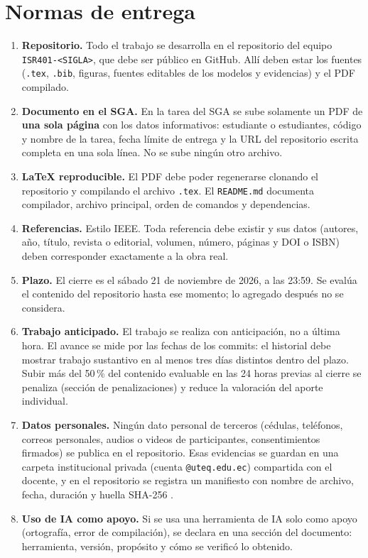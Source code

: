 \documentclass[11pt]{article}
\newcommand{\seccion}[1]{\section{\textcolor{utegreendk}{#1}}}
\begin{document}
\seccion{Normas de entrega}

\begin{enumerate}[leftmargin=20pt,itemsep=3pt]
	\item \textbf{Repositorio.} Todo el trabajo se desarrolla en el repositorio del equipo \texttt{ISR401-<SIGLA>}, que debe ser público en GitHub. Allí deben estar los fuentes (\texttt{.tex}, \texttt{.bib}, figuras, fuentes editables de los modelos y evidencias) y el PDF compilado.
	\item \textbf{Documento en el SGA.} En la tarea del SGA se sube solamente un PDF de \textbf{una sola página} con los datos informativos: estudiante o estudiantes, código y nombre de la tarea, fecha límite de entrega y la URL del repositorio escrita completa en una sola línea. No se sube ningún otro archivo.
	\item \textbf{\LaTeX{} reproducible.} El PDF debe poder regenerarse clonando el repositorio y compilando el archivo \texttt{.tex}. El \texttt{README.md} documenta compilador, archivo principal, orden de comandos y dependencias.
	\item \textbf{Referencias.} Estilo IEEE. Toda referencia debe existir y sus datos (autores, año, título, revista o editorial, volumen, número, páginas y DOI o ISBN) deben corresponder exactamente a la obra real.
	\item \textbf{Plazo.} El cierre es el sábado 21 de noviembre de 2026, a las 23:59. Se evalúa el contenido del repositorio hasta ese momento; lo agregado después no se considera.
	\item \textbf{Trabajo anticipado.} El trabajo se realiza con anticipación, no a última hora. El avance se mide por las fechas de los commits: el historial debe mostrar trabajo sustantivo en al menos tres días distintos dentro del plazo. Subir más del 50\,\% del contenido evaluable en las 24 horas previas al cierre se penaliza (sección de penalizaciones) y reduce la valoración del aporte individual.
	\item \textbf{Datos personales.} Ningún dato personal de terceros (cédulas, teléfonos, correos personales, audios o videos de participantes, consentimientos firmados) se publica en el repositorio. Esas evidencias se guardan en una carpeta institucional privada (cuenta \texttt{@uteq.edu.ec}) compartida con el docente, y en el repositorio se registra un manifiesto con nombre de archivo, fecha, duración y huella SHA-256 \citep{lopdp_2021}.
	\item \textbf{Uso de IA como apoyo.} Si se usa una herramienta de IA solo como apoyo (ortografía, error de compilación), se declara en una sección del documento: herramienta, versión, propósito y cómo se verificó lo obtenido.
\end{enumerate}
\end{document}
